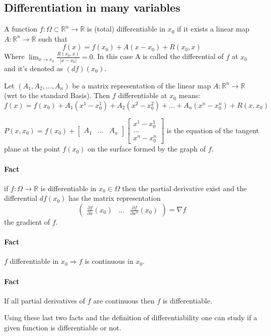 \documentclass[11pt,a4paper]{book}
\begin{document}
\subsection{Differentiation in many variables}
A function $f:\Omega \subset \mathbb{R}^n \rightarrow \mathbb{R}$ is (total) differentiable in $x_0$ if it exists a linear map $A:\mathbb{R}^n \rightarrow \mathbb{R}$ such that $$f(x)=f(x_0)+A(x-x_0)+R(x_0,x)$$
Where $\lim_{x\rightarrow x_0} \frac{R(x_0,x)}{|x-x_0|}=0$.
In this case A is called the differential of $f$ at $x_0$ and it's denoted as $(df)(x_0)$.

Let $(A_1, A_2, ... , A_n)$ be a matrix representation of the linear map $A:\mathbb{R}^n \rightarrow \mathbb{R}$ (wrt to the standard Basis). Then $f$ differentiable at $x_0$ means:
$$f(x)=f(x_0)+A_1(x^1-x_0^1)+A_2(x^2-x_0^2)+...+A_n(x^n-x_0^n)+R(x,x_0)$$

$P(x,x_0)=f(x_0)+\begin{bmatrix}
A_1 & ... & A_n
\end{bmatrix} \begin{bmatrix}
x^1-x_0^1 \\ 
... \\ 
x^n-x_0^n
\end{bmatrix} $
is the equation of the tangent plane at the point $f(x_0)$ on the surface formed by the graph of $f$.
\paragraph*{Fact}
if $f:\Omega \rightarrow \mathbb{R}$ is differentiable in $x_0 \in \Omega$ then the partial derivative exist and the differential $df(x_0)$ has the matrix representation $$\begin{pmatrix}
\frac{\partial f}{\partial x}(x_0) & ... & \frac{\partial f}{\partial x^n}(x_0) \end{pmatrix} = \nabla f$$ the gradient of $f$.
\paragraph*{Fact} $f$ differentiable in $x_0 \Rightarrow f$ is continuous in $x_0$.
\paragraph*{Fact} If all partial derivatives of $f$ are continuous then $f$ is differentiable.

Using these last two facts and the definition of differentiability one can study if a given function is differentiable or not. 
\end{document}
